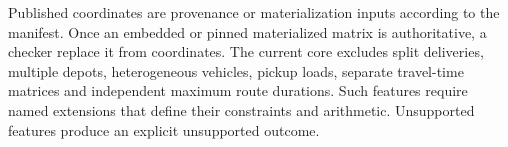 Published coordinates are provenance or materialization inputs according to the manifest. Once an embedded or pinned materialized matrix is authoritative, a checker \mustnot{} replace it from coordinates. The current core excludes split deliveries, multiple depots, heterogeneous vehicles, pickup loads, separate travel-time matrices and independent maximum route durations. Such features require named extensions that define their constraints and arithmetic. Unsupported features \must{} produce an explicit unsupported outcome.
